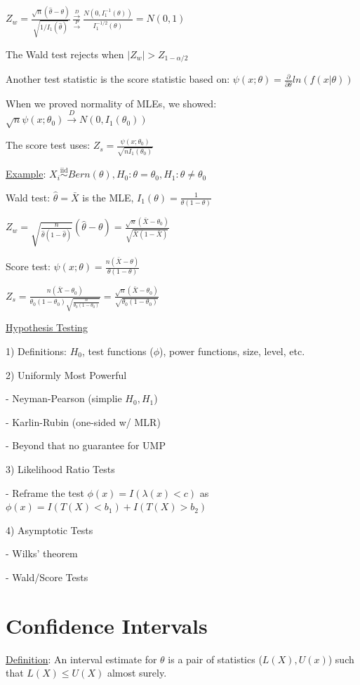 \documentclass{article}
\newcommand{\pto}{\overset{P}{\to}}
\newcommand{\dto}{\overset{D}{\to}}
\newcommand{\iiddist}{\overset{\mathrm{iid}}{\sim}}
\begin{document}
$Z_w = \frac{\sqrt{n}(\hat{\theta} - \theta)}{\sqrt{1/I_1(\hat{\theta})}} \frac{\dto}{\pto} \frac{N(0, I_1^{-1}(\theta))}{I_1^{-1/2}(\theta)} = N(0, 1)$

The Wald test rejects when $|Z_w| > Z_{1-\alpha/2}$

Another test statistic is the score statistic based on: $\psi(x;\theta) = \frac{\partial}{\partial \theta} ln(f(x|\theta))$

When we proved normality of MLEs, we showed: $\sqrt{n} \psi(x;\theta_0) \dto N(0, I_1(\theta_0))$

The score test uses: $Z_s = \frac{\psi(x;\theta_0)}{\sqrt{n I_1(\theta_0)}}$

\underline{Example}: $X_i \iiddist Bern(\theta), H_0: \theta = \theta_0, H_1: \theta \neq \theta_0$

Wald test: $\hat{\theta} = \bar{X}$ is the MLE, $I_1(\theta) = \frac{1}{\theta(1-\theta)}$

$Z_w = \sqrt{\frac{n}{\hat{\theta}(1-\hat{\theta})}}(\hat{\theta} - \theta) = \frac{\sqrt{n}(\bar{X} - \theta_0)}{\sqrt{\bar{X}(1-\bar{X})}}$

Score test: $\psi(x;\theta) = \frac{n(\bar{X} - \theta)}{\theta(1-\theta)}$

$Z_s = \frac{n(\bar{X} - \theta_0)}{\theta_0(1-\theta_0)\sqrt{\frac{n}{\theta_0(1-\theta_0)}}} = \frac{\sqrt{n} (\bar{X} - \theta_0)}{\sqrt{\theta_0(1-\theta_0)}}$

\underline{Hypothesis Testing}

1) Definitions: $H_0$, test functions ($\phi$), power functions, size, level, etc.

2) Uniformly Most Powerful

- Neyman-Pearson (simplie $H_0, H_1$)

- Karlin-Rubin (one-sided w/ MLR)

- Beyond that no guarantee for UMP

3) Likelihood Ratio Tests

- Reframe the test $\phi(x) = I(\lambda(x) < c)$ as $\phi(x) = I(T(X) < b_1) + I(T(X) > b_2)$

4) Asymptotic Tests

- Wilks' theorem

- Wald/Score Tests

\section{Confidence Intervals}

\underline{Definition}: An interval estimate for $\theta$ is a pair of statistics ($L(X), U(x)$) such that $L(X) \le U(X)$ almost surely. 
\end{document}
